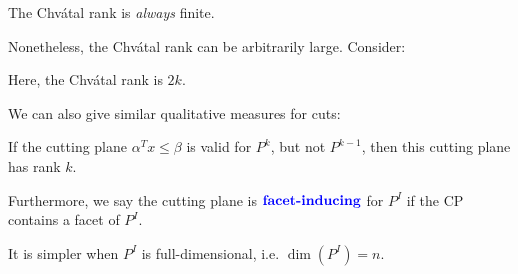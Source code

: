 
\begin{conclusion}
    The Chv\'atal rank is \emph{always} finite.
\end{conclusion}
\begin{remark}
    Nonetheless, the Chv\'atal rank can be arbitrarily large. Consider:
    \vspace{5pt}
    \\
    \begin{minipage}{\textwidth}
        \centering
    \end{minipage}
    Here, the Chv\'atal rank is $2k$.
\end{remark}
We can also give similar qualitative measures for cuts:
\begin{definition}
    If the cutting plane $\alpha^Tx \leq \beta$ is valid for $P^k$, but not $P^{k-1}$, then this cutting plane
    has  rank $k$.

    Furthermore, we say the cutting plane is $\vocab{facet-inducing}$ for $P^I$ if the CP contains a facet of $P^I$.
\end{definition}

It is simpler when $P^I$ is full-dimensional, i.e. $\dim(P^I)=n$.

